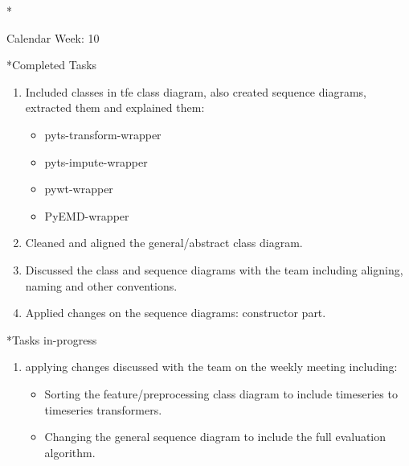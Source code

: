 \documentclass[11pt,a4paper]{article}
\begin{document}
\newpage
\begin{section}*{Calendar Week: 10 \hfill \date{12 March, 2021}}
	
	\begin{subsection}*{Completed Tasks}
		\begin{enumerate}
			\item Included classes in tfe class diagram, also created sequence diagrams, extracted them and explained them:
			\begin{itemize}
				\item pyts-transform-wrapper
				\item pyts-impute-wrapper
				\item pywt-wrapper
				\item PyEMD-wrapper
			\end{itemize}
			\item Cleaned and aligned the general/abstract class diagram.
			\item Discussed the class and sequence diagrams with the team including aligning, naming and other conventions.
			\item Applied changes on the sequence diagrams: constructor part.
		\end{enumerate}
	\end{subsection}
	
	\begin{subsection}*{Tasks in-progress}
		\begin{enumerate}
			\item applying changes discussed with the team on the weekly meeting including:
			\begin{itemize}
				\item Sorting the feature/preprocessing class diagram to include timeseries to timeseries transformers.
				\item Changing the general sequence diagram to include the full evaluation algorithm.
			\end{itemize}
		\end{enumerate}
	\end{subsection}
	
\end{section}
\end{document}
